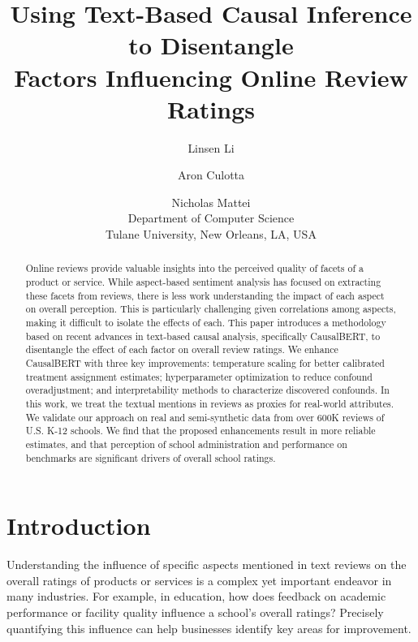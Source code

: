 \documentclass[11pt]{article}
\title{Using Text-Based Causal Inference to Disentangle\\ Factors Influencing Online Review Ratings}
\author{Linsen Li \and Aron Culotta \and Nicholas Mattei \\
        Department of Computer Science\\
        Tulane University, New Orleans, LA, USA}
\begin{document}
\maketitle

\vspace{-.5cm}

\begin{abstract}
Online reviews provide valuable insights into the perceived quality of facets of a product or service. While aspect-based sentiment analysis has focused on extracting these facets from reviews, there is less work understanding the impact of each aspect on overall perception. This is particularly challenging given correlations among aspects, making it difficult to isolate the effects of each. This paper introduces a methodology based on recent advances in text-based causal analysis, specifically CausalBERT, to disentangle the effect of each factor on overall review ratings. We enhance CausalBERT with three key improvements: temperature scaling for better calibrated treatment assignment estimates; hyperparameter optimization to reduce confound overadjustment; and interpretability methods to characterize discovered confounds. In this work, we treat the textual mentions in reviews as proxies for real-world attributes. We validate our approach on real and semi-synthetic data from over 600K reviews of U.S. K-12 schools. We find that the proposed enhancements result in more reliable estimates, and that perception of school administration and performance on benchmarks are significant drivers of overall school ratings.

\end{abstract}





\section{Introduction}
Understanding the influence of specific aspects mentioned in text reviews on the overall ratings of products or services is a complex yet important endeavor in many industries.
For example, in education, how does feedback on academic performance or facility quality influence a school’s overall ratings? Precisely quantifying this influence can help businesses identify key areas for improvement.
\end{document}
